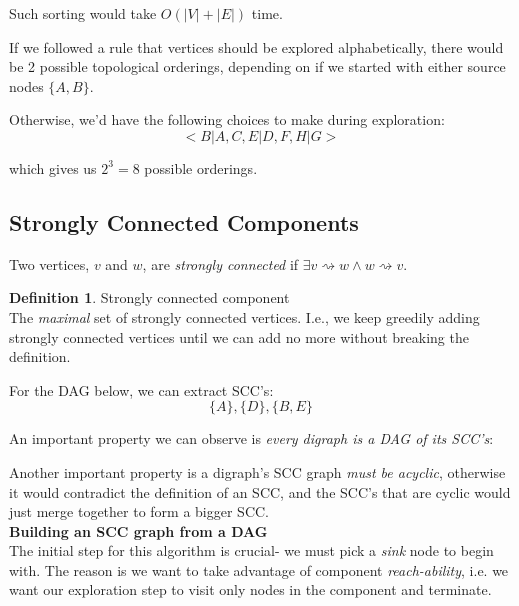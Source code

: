 \documentclass{article}
\theoremstyle{definition}
\newtheorem{definition}{Definition}[section]
\begin{document}
Such sorting would take $O(|V| + |E|)$ time.

If we followed a rule that vertices should be explored alphabetically, there would be 2 possible topological orderings, depending on if we started with either source nodes $\{A, B\}$. 

Otherwise, we'd have the following choices to make during exploration:
$$<B|A, C, E|D, F, H|G>$$

which gives us $2^3 = 8$ possible orderings.

\subsection{Strongly Connected Components}
Two vertices, $v$ and $w$, are \textit{strongly connected} if $\exists v \rightsquigarrow w \land w \rightsquigarrow v$.

\begin{definition}{Strongly connected component}
	\label{def:scc}
	\\The \textit{maximal} set of strongly connected vertices. I.e., we keep greedily adding strongly connected vertices until we can add no more without breaking the definition.
\end{definition}

For the DAG below, we can extract SCC's:
$$\{A\}, \{D\}, \{B,E\}$$

An important property we can observe is \textit{every digraph is a DAG of its SCC's}:


Another important property is a digraph's SCC graph \textit{must be acyclic}, otherwise it would contradict the definition of an SCC, and the SCC's that are cyclic would just merge together to form a bigger SCC.\\

\textbf{Building an SCC graph from a DAG}\\
The initial step for this algorithm is crucial- we must pick a \textit{sink} node to begin with. The reason is we want to take advantage of component \textit{reach-ability}, i.e. we want our exploration step to visit only nodes in the component and terminate.
\end{document}
